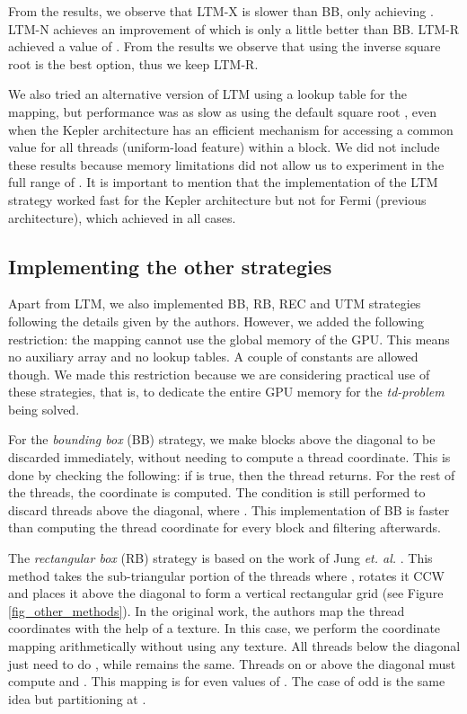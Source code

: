 \documentclass[conference]{IEEEtran}
\begin{document}
From the results, we observe that LTM-X is slower than BB, only achieving . LTM-N achieves an improvement of  which is only a little better than BB.
LTM-R achieved a value of . From the results we observe that using the inverse square root is the best option, thus we keep LTM-R.

We also tried an alternative version of LTM using a lookup table for the mapping, but performance was as slow as using 
the default square root , even when the Kepler architecture has an efficient mechanism for accessing a common value 
for all threads (uniform-load feature) within a block. We did not include these results because memory limitations did not allow us to 
experiment in the full range of . It is important to mention that the implementation of the LTM strategy worked fast for 
the Kepler architecture but not for Fermi (previous architecture), which achieved  in all cases. 
\subsection{Implementing the other strategies}
Apart from LTM, we also implemented BB, RB, REC and UTM strategies following the details given by the authors. However, we added the following restriction: 
the mapping cannot use the global memory of the GPU. This means no auxiliary array and no lookup tables. A couple of constants are allowed though. 
We made this restriction because we are considering practical use of these strategies, that is, to dedicate the entire GPU memory for the \textit{td-problem} being solved.

For the \textit{bounding box} (BB) strategy, we make blocks above the diagonal to be discarded immediately, without needing to compute a thread coordinate. This is done by checking the following: 
if  is true, then the thread returns. For the rest of the threads, the coordinate is computed. The condition  is still performed to discard threads above the diagonal, where . 
This implementation of BB is faster than computing the thread coordinate for every block and filtering afterwards.

The \textit{rectangular box} (RB) strategy is based on the work of Jung \textit{et. al.} \cite{Jung2008}. This method takes the sub-triangular portion of the threads where , rotates it CCW and 
places it above the diagonal to form a vertical rectangular grid (see Figure \ref{fig_other_methods}). In the original work, the authors map the thread coordinates with the help of a texture. In this case, 
we perform the coordinate mapping arithmetically without using any texture. All threads below the diagonal just need to do , while  remains the same. 
Threads on or above the diagonal must compute  and . This mapping is for even values of . The case of odd  is the same idea but partitioning at .
\end{document}
